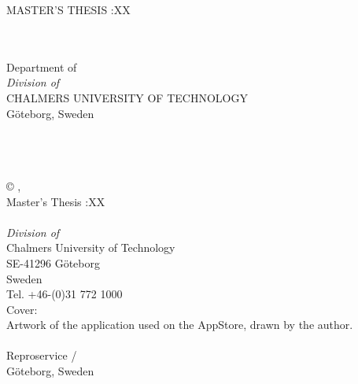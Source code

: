 \begin{titlepage}
\begin{center}

MASTER'S THESIS \thesisyear:XX\\
\vspace{5cm} 
\huge{\thesistitle}\\ 
\vspace{0.5cm} 
\huge{\thesissubtitle}\\
\vspace{1cm} 
\LARGE{\thesisauthor}

\vspace{9.7cm}
\enlargethispage{2cm}
\normalsize{
Department of \thesisdepartment\\
\textit{Division of \thesisdivision}\\
CHALMERS UNIVERSITY OF TECHNOLOGY\\
G\"oteborg, Sweden \thesisyear}

\end{center}
\end{titlepage}

\thispagestyle{empty}
\noindent
\thesistitle\\
\thesissubtitle\\
\thesisauthor
\vspace{\baselineskip}\\
\copyright \hspace{1ex} \thesisauthor, \thesisyear
\vspace{3cm}\\
Master's Thesis \thesisyear:XX
\vspace{\baselineskip}\\
\thesisdepartment\\
\textit{Division of \thesisdivision}\\
Chalmers University of Technology\\
SE-41296 G\"oteborg\\
Sweden
\vspace{\baselineskip}\\
Tel.	+46-(0)31 772 1000
\enlargethispage{2cm}
\vspace{10cm}\\
Cover:\\
Artwork of the application used on the AppStore, drawn by the author.\\
\vspace{0cm}\\
Reproservice / \thesisrepro\\
G\"oteborg, Sweden \thesisyear


